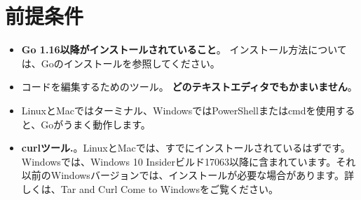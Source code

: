 \section{前提条件}

\begin{itemize}
\item
  \textbf{Go 1.16以降がインストールされていること}。
  インストール方法については、Goのインストールを参照してください。
\item
  コードを編集するためのツール。
  \textbf{どのテキストエディタでもかまいません}。
\item
  LinuxとMacではターミナル、WindowsではPowerShellまたはcmdを使用すると、Goがうまく動作します。
\item
  \textbf{curlツール.}。LinuxとMacでは、すでにインストールされているはずです。Windowsでは、Windows
  10
  Insiderビルド17063以降に含まれています。それ以前のWindowsバージョンでは、インストールが必要な場合があります。詳しくは、Tar
  and Curl Come to Windowsをご覧ください。
\end{itemize}
